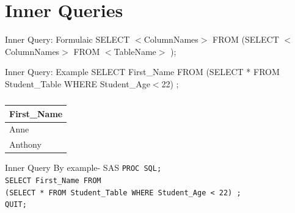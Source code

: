 \documentclass[handout]{beamer}
\begin{document}
	\section{Inner Queries}
	\begin{frame}
		\begin{block}{Inner Query: Formulaic}
			SELECT $<$ColumnNames$>$ FROM (SELECT $<$ColumnNames$>$ FROM $<$TableName$>$ );
		\end{block}
		\begin{block}{Inner Query: Example}
			SELECT First\_Name FROM (SELECT * FROM Student\_Table WHERE Student\_Age$<$22) ;
		\end{block}		
	\begin{table}[H]
	\centering
	\caption*{}

	\begin{tabular}{|l|}
		\hline
		First\_Name  \\ \hline
		Anne  \\ \hline
		Anthony  \\    \hline
	\end{tabular}
	\end{table}				
	\end{frame}
	
	\begin{frame}{Inner Query By example- SAS}
		\texttt{PROC SQL;} \\
		\texttt{SELECT First\_Name FROM } \\
		\texttt{(SELECT * FROM Student\_Table WHERE Student\_Age < 22) ;}\\
		\texttt{QUIT;}
	\end{frame}	
	
	
	
\end{document}

